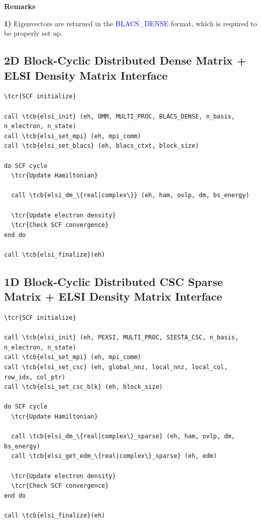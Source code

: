 \documentclass{report}
\newcommand{\tcb}[1]{\textcolor{blue}{#1}}
\newcommand{\tcr}[1]{\textcolor{red}{#1}}
\begin{document}
\textbf{Remarks}

\textbf{1)} Eigenvectors are returned in the \tcb{BLACS\_DENSE} format, which is required to be properly set up.

\subsection*{2D Block-Cyclic Distributed Dense Matrix + ELSI Density Matrix Interface}
\begin{tcolorbox}
\begin{Verbatim}[commandchars=\\\{\}]
\tcr{SCF initialize}

call \tcb{elsi_init} (eh, OMM, MULTI_PROC, BLACS_DENSE, n_basis, n_electron, n_state)
call \tcb{elsi_set_mpi} (eh, mpi_comm)
call \tcb{elsi_set_blacs} (eh, blacs_ctxt, block_size)

do SCF cycle
  \tcr{Update Hamiltonian}

  call \tcb{elsi_dm_\{real|complex\}} (eh, ham, ovlp, dm, bs_energy)

  \tcr{Update electron density}
  \tcr{Check SCF convergence}
end do

call \tcb{elsi_finalize}(eh)
\end{Verbatim}
\end{tcolorbox}

\subsection*{1D Block-Cyclic Distributed CSC Sparse Matrix + ELSI Density Matrix Interface}
\begin{tcolorbox}
\begin{Verbatim}[commandchars=\\\{\}]
\tcr{SCF initialize}

call \tcb{elsi_init} (eh, PEXSI, MULTI_PROC, SIESTA_CSC, n_basis, n_electron, n_state)
call \tcb{elsi_set_mpi} (eh, mpi_comm)
call \tcb{elsi_set_csc} (eh, global_nnz, local_nnz, local_col, row_idx, col_ptr)
call \tcb{elsi_set_csc_blk} (eh, block_size)

do SCF cycle
  \tcr{Update Hamiltonian}

  call \tcb{elsi_dm_\{real|complex\}_sparse} (eh, ham, ovlp, dm, bs_energy)
  call \tcb{elsi_get_edm_\{real|complex\}_sparse} (eh, edm)

  \tcr{Update electron density}
  \tcr{Check SCF convergence}
end do

call \tcb{elsi_finalize}(eh)
\end{Verbatim}
\end{tcolorbox}
\end{document}
